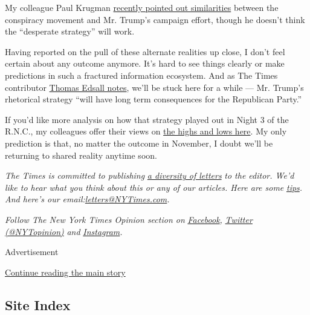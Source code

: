 My colleague Paul Krugman
\href{https://www.nytimes3xbfgragh.onion/2020/08/24/opinion/trump-qanon-convention.html}{recently
pointed out similarities} between the conspiracy movement and Mr.
Trump's campaign effort, though he doesn't think the ``desperate
strategy'' will work.

Having reported on the pull of these alternate realities up close, I
don't feel certain about any outcome anymore. It's hard to see things
clearly or make predictions in such a fractured information ecosystem.
And as The Times contributor
\href{https://www.nytimes3xbfgragh.onion/2020/08/26/opinion/trump-republican-convention-racism.html?action=click\&module=Opinion\&pgtype=Homepage}{Thomas
Edsall notes}, we'll be stuck here for a while --- Mr. Trump's
rhetorical strategy ``will have long term consequences for the
Republican Party.''

If you'd like more analysis on how that strategy played out in Night 3
of the R.N.C., my colleagues offer their views on
\href{https://www.nytimes3xbfgragh.onion/2020/08/27/opinion/rnc-best-worst-night-3.html}{the
highs and lows here}. My only prediction is that, no matter the outcome
in November, I doubt we'll be returning to shared reality anytime soon.

\emph{The Times is committed to publishing}
\href{https://www.nytimes3xbfgragh.onion/2019/01/31/opinion/letters/letters-to-editor-new-york-times-women.html}{\emph{a
diversity of letters}} \emph{to the editor. We'd like to hear what you
think about this or any of our articles. Here are some}
\href{https://help.nytimes3xbfgragh.onion/hc/en-us/articles/115014925288-How-to-submit-a-letter-to-the-editor}{\emph{tips}}\emph{.
And here's our
email:}\href{mailto:letters@NYTimes.com}{\emph{letters@NYTimes.com}}\emph{.}

\emph{Follow The New York Times Opinion section on}
\href{https://www.facebookcorewwwi.onion/nytopinion}{\emph{Facebook}}\emph{,}
\href{http://twitter.com/NYTOpinion}{\emph{Twitter (@NYTopinion)}}
\emph{and}
\href{https://www.instagram.com/nytopinion/}{\emph{Instagram}}\emph{.}

Advertisement

\protect\hyperlink{after-bottom}{Continue reading the main story}

\hypertarget{site-index}{%
\subsection{Site Index}\label{site-index}}

